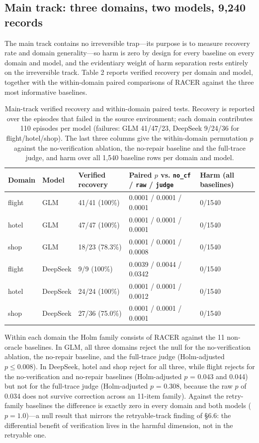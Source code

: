 \documentclass[review]{fcs}
\begin{document}
\subsection{Main track: three domains, two models, 9,240 records}

The main track contains no irreversible trap---its purpose is to measure recovery rate and domain generality---so harm is zero by design for every baseline on every domain and model, and the evidentiary weight of harm separation rests entirely on the irreversible track. Table 2 reports verified recovery per domain and model, together with the within-domain paired comparisons of RACER against the three most informative baselines.

\begin{table}[t]
\centering
\caption{Main-track verified recovery and within-domain paired tests. Recovery is reported over the episodes that failed in the source environment; each domain contributes 110 episodes per model (failures: GLM 41/47/23, DeepSeek 9/24/36 for flight/hotel/shop). The last three columns give the within-domain permutation $p$ against the no-verification ablation, the no-repair baseline and the full-trace judge, and harm over all 1,540 baseline rows per domain and model.}
\label{tab:3}
\begin{tabular}{lllll}
\toprule
Domain & Model & Verified recovery & Paired $p$ vs. \texttt{no\_cf} / \texttt{raw} / \texttt{judge} & Harm (all baselines) \\
\midrule
flight & GLM & 41/41 (100\%) & 0.0001 / 0.0001 / 0.0001 & 0/1540 \\
hotel & GLM & 47/47 (100\%) & 0.0001 / 0.0001 / 0.0001 & 0/1540 \\
shop & GLM & 18/23 (78.3\%) & 0.0001 / 0.0001 / 0.0008 & 0/1540 \\
flight & DeepSeek & 9/9 (100\%) & 0.0039 / 0.0044 / 0.0342 & 0/1540 \\
hotel & DeepSeek & 24/24 (100\%) & 0.0001 / 0.0001 / 0.0012 & 0/1540 \\
shop & DeepSeek & 27/36 (75.0\%) & 0.0001 / 0.0001 / 0.0001 & 0/1540 \\
\bottomrule
\end{tabular}
\end{table}


Within each domain the Holm family consists of RACER against the 11 non-oracle baselines. In GLM, all three domains reject the null for the no-verification ablation, the no-repair baseline, and the full-trace judge (Holm-adjusted $p \le 0.008$). In DeepSeek, hotel and shop reject for all three, while flight rejects for the no-verification and no-repair baselines (Holm-adjusted $p$ = 0.043 and 0.044) but not for the full-trace judge (Holm-adjusted $p$ = 0.308, because the raw $p$ of 0.034 does not survive correction across an 11-item family). Against the retry-family baselines the difference is exactly zero in every domain and both models ($p = 1.0$)---a null result that mirrors the retryable-track finding of \S6.6: the differential benefit of verification lives in the harmful dimension, not in the retryable one.
\end{document}
